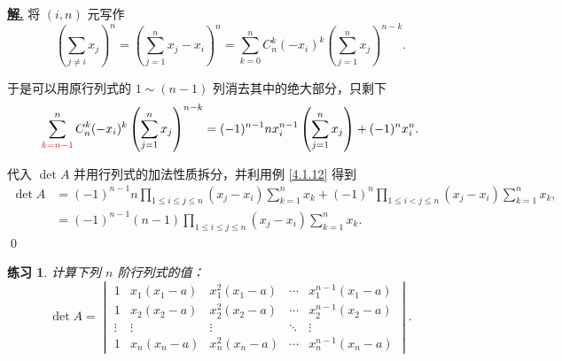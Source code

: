 \documentclass[10pt,openany]{article}
\theoremstyle{thmstyle} %
\newtheorem{practice}{练习}[section]
\theoremstyle{defstyle} %
\theoremstyle{prostyle} %
\theoremstyle{exastyle}
\theoremstyle{remstyle}
\newenvironment{solution}{\par\underline{\textbf{解.}} \;\fangsong}{\qed\par}
\begin{document}
\begin{solution}
	将 \( (i,n) \) 元写作
	\[ \left( \sum_{j \neq i}^{} x_j \right)^n= \left( \sum_{j=1}^{n} x_j-x_i \right)^n= \sum_{k=0}^{n} C_n^k (-x_i)^k \left( \sum_{j=1}^{n} x_j \right)^{n-k}. \]
	
	于是可以用原行列式的 \( 1 \sim (n-1) \) 列消去其中的绝大部分，只剩下
	\[ \sum_{{\color{red}k= n-1}}^{n} C_n^k (-x_i)^k \left( \sum_{j=1}^{n} x_j \right)^{n-k}=(-1)^{n-1} nx_i^{n-1} \left( \sum_{j=1}^{n} x_j \right)+ (-1)^n x_i^n. \]
	
	代入 \( \det A \) 并用行列式的加法性质拆分，并利用例 \ref{4.1.12} 得到
	\begin{align*}
		\det A &= (-1)^{n-1} n \prod_{1 \leq i \leq j \leq n}^{} (x_j-x_i) \sum_{k=1}^{n} x_k+ (-1)^n \prod_{1 \leq i<j \leq n}^{} (x_j-x_i) \sum_{k=1}^{n} x_k, \\
		&= (-1)^{n-1} (n-1) \prod_{1 \leq i \leq j \leq n}^{} (x_j-x_i) \sum_{k=1}^{n} x_k.
	\end{align*}
\end{solution}


\begin{practice}
	计算下列 \( n \) 阶行列式的值：
	\[ \det A= \begin{vmatrix}
		1 & x_1(x_1-a) & x_1^{2}(x_1-a) & \cdots & x_1^{n-1}(x_1-a) \\
		1 & x_2(x_2-a) & x_2^{2}(x_2-a) & \cdots & x_2^{n-1}(x_2-a) \\
		\vdots & \vdots & \vdots & \ddots & \vdots \\
		1 & x_n(x_n-a) & x_n^{2}(x_n-a) & \cdots & x_n^{n-1}(x_n-a)
	\end{vmatrix}. \]
\end{practice}
\end{document}
